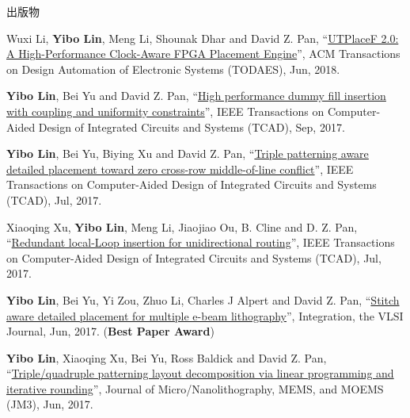 \begin{rSection}{出版物}
\begin{description}[font=\normalfont, rightmargin=2em]
{}
            

\item[{[J8]}]{
        Wuxi Li, \textbf{Yibo Lin}, Meng Li, Shounak Dhar and David Z. Pan, 
    ``\href{https://doi.org/10.1145/3174849}{UTPlaceF 2.0: A High-Performance Clock-Aware FPGA Placement Engine}'', 
    ACM Transactions on Design Automation of Electronic Systems (TODAES), Jun, 2018.
    
}
            

\item[{[J7]}]{
        \textbf{Yibo Lin}, Bei Yu and David Z. Pan, 
    ``\href{http://dx.doi.org/10.1109/TCAD.2016.2638452}{High performance dummy fill insertion with coupling and uniformity constraints}'', 
    IEEE Transactions on Computer-Aided Design of Integrated Circuits and Systems (TCAD), Sep, 2017.
    
}
            

\item[{[J6]}]{
        \textbf{Yibo Lin}, Bei Yu, Biying Xu and David Z. Pan, 
    ``\href{http://dx.doi.org/10.1109/TCAD.2017.2648843}{Triple patterning aware detailed placement toward zero cross-row middle-of-line conflict}'', 
    IEEE Transactions on Computer-Aided Design of Integrated Circuits and Systems (TCAD), Jul, 2017.
    
}
            

\item[{[J5]}]{
        Xiaoqing Xu, \textbf{Yibo Lin}, Meng Li, Jiaojiao Ou,  B. Cline  and  D. Z. Pan, 
    ``\href{http://dx.doi.org/10.1109/TCAD.2017.2651811}{Redundant local-Loop insertion for unidirectional routing}'', 
    IEEE Transactions on Computer-Aided Design of Integrated Circuits and Systems (TCAD), Jul, 2017.
    
}
            

\item[{[J4]}]{
        \textbf{Yibo Lin}, Bei Yu, Yi Zou, Zhuo Li, Charles J Alpert and David Z. Pan, 
    ``\href{http://dx.doi.org/10.1016/j.vlsi.2017.02.004}{Stitch aware detailed placement for multiple e-beam lithography}'', 
    Integration, the VLSI Journal, Jun, 2017.
    (\textbf{Best Paper Award})
}
            

\item[{[J3]}]{
        \textbf{Yibo Lin}, Xiaoqing Xu, Bei Yu, Ross Baldick and David Z. Pan, 
    ``\href{http://dx.doi.org/10.1117/1.JMM.16.2.023507}{Triple/quadruple patterning layout decomposition via linear programming and iterative rounding}'', 
    Journal of Micro/Nanolithography, MEMS, and MOEMS (JM3), Jun, 2017.
    
}
\end{description}
\end{rSection}
